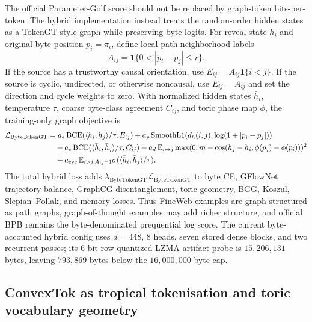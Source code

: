 \documentclass[11pt]{article}
\theoremstyle{definition}
\theoremstyle{plain}
\theoremstyle{remark}
\numberwithin{equation}{section}
\begin{document}
The official Parameter-Golf score should not be replaced by graph-token
bits-per-token.  The hybrid implementation instead treats the random-order
hidden states as a TokenGT-style graph while preserving byte logits.  For
reveal state $h_i$ and original byte position $p_i=\pi_i$, define local
path-neighborhood labels
\begin{equation}
  A_{ij}=\mathbf 1\{0<|p_i-p_j|\le r\}.
\end{equation}
If the source has a trustworthy causal orientation, use
$E_{ij}=A_{ij}\mathbf 1\{i<j\}$.  If the source is cyclic, undirected, or
otherwise noncausal, use $E_{ij}=A_{ij}$ and set the direction and cycle
weights to zero.  With normalized hidden states $\bar h_i$, temperature
$\tau$, coarse byte-class agreement $C_{ij}$, and toric phase map $\phi$, the
training-only graph objective is
\begin{align}
\mathcal L_{\mathrm{ByteTokenGT}}
&=
a_e\,{\rm BCE}(\langle \bar h_i,\bar h_j\rangle/\tau,E_{ij})
+a_p\,{\rm SmoothL1}(d_h(i,j),\log(1+|p_i-p_j|))\\
&\quad
+a_c\,{\rm BCE}(\langle \bar h_i,\bar h_j\rangle/\tau,C_{ij})
+a_d\,\mathbb E_{i\to j}\max(0,m-\cos(h_j-h_i,\phi(p_j)-\phi(p_i)))^2\\
&\quad
+a_{\rm cyc}\,\mathbb E_{i>j,A_{ij}=1}\sigma(\langle \bar h_i,\bar h_j\rangle/\tau).
\end{align}
The total hybrid loss adds
$\lambda_{\mathrm{ByteTokenGT}}\mathcal L_{\mathrm{ByteTokenGT}}$ to byte CE,
GFlowNet trajectory balance, GraphCG disentanglement, toric geometry, BGG,
Koszul, Slepian--Pollak, and memory losses.  Thus FineWeb examples are
graph-structured as path graphs, graph-of-thought examples may add richer
structure, and official BPB remains the byte-denominated prequential log score.
The current byte-accounted hybrid config uses $d=448$, $8$ heads, seven stored
dense blocks, and two recurrent passes; its 6-bit row-quantized LZMA artifact
probe is $15{,}206{,}131$ bytes, leaving $793{,}869$ bytes below the
$16{,}000{,}000$ byte cap.

\subsection{ConvexTok as tropical tokenisation and toric vocabulary geometry}
\end{document}
